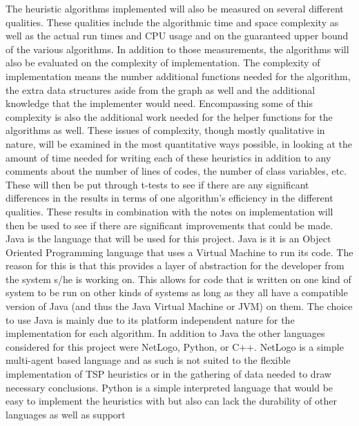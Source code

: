 \documentclass[midd]{thesis}
\newcommand{\tab}{\hspace*{2em}}
\begin{document}
\tab The heuristic algorithms implemented will also be measured on several different qualities. These qualities include the algorithmic time and space complexity as well as the actual run times and CPU usage and on the guaranteed upper bound of the various algorithms. In addition to those measurements, the algorithms will also be evaluated on the complexity of implementation. The complexity of implementation means the number additional functions needed for the algorithm, the extra data structures aside from the graph as well and the additional knowledge that the implementer would need. Encompassing some of this complexity is also the additional work needed for the helper functions for the algorithms as well. These issues of complexity, though mostly qualitative in nature, will be examined in the most quantitative ways possible, in looking at the amount of time needed for writing each of these heuristics in addition to any comments about the number of lines of codes, the number of class variables, etc. These will then be put through t-tests to see if there are any significant differences in the results in terms of one algorithm's efficiency in the different qualities. These results in combination with the notes on implementation will then be used to see if there are significant improvements that could be made.\\
\tab Java is the language that will be used for this project. Java is it is an Object Oriented Programming language that uses a Virtual Machine to run its code. The reason for this is that this provides a layer of abstraction for the developer from the system s/he is working on. This allows for code that is written on one kind of system to be run on other kinds of systems as long as they all have a compatible version of Java (and thus the Java Virtual Machine or JVM) on them. The choice to use Java is mainly due to its platform independent nature for the implementation for each algorithm. In addition to Java the other languages considered for this project were NetLogo, Python, or C++. NetLogo is a simple multi-agent based language and as such is not suited to the flexible implementation of TSP heuristics or in the gathering of data needed to draw necessary conclusions. Python is a simple interpreted language that would be easy to implement the heuristics with but also can lack the durability of other languages as well as support 
\end{document}
